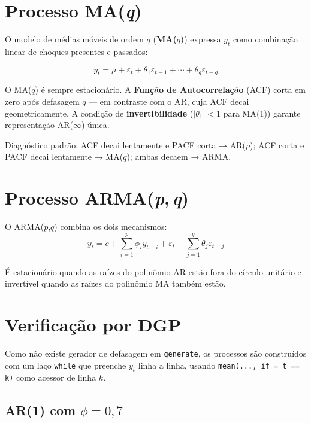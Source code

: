 \section{Processo MA(\textit{q})}

O modelo de médias móveis de ordem $q$ (\textbf{MA($q$)}) expressa $y_t$
como combinação linear de choques presentes e passados:

\[
  y_t = \mu + \varepsilon_t + \theta_1 \varepsilon_{t-1}
        + \cdots + \theta_q \varepsilon_{t-q}
\]

O MA($q$) é sempre estacionário. A \textbf{Função de Autocorrelação} (ACF)
corta em zero após defasagem $q$ — em contraste com o AR, cuja ACF decai
geometricamente. A condição de \textbf{invertibilidade} ($|\theta_1| < 1$
para MA(1)) garante representação AR($\infty$) única.

\begin{nota}
  Diagnóstico padrão: ACF decai lentamente e PACF corta → AR($p$);
  ACF corta e PACF decai lentamente → MA($q$); ambas decaem → ARMA.
\end{nota}

\section{Processo ARMA(\textit{p},\,\textit{q})}

O ARMA($p$,$q$) combina os dois mecanismos:
\[
  y_t = c + \sum_{i=1}^p \phi_i y_{t-i}
        + \varepsilon_t + \sum_{j=1}^q \theta_j \varepsilon_{t-j}
\]

É estacionário quando as raízes do polinômio AR estão fora do círculo
unitário e invertível quando as raízes do polinômio MA também estão.

\section{Verificação por DGP}

Como não existe gerador de defasagem em \lstinline{generate}, os processos
são construídos com um laço \lstinline{while} que preenche $y_t$ linha a
linha, usando \lstinline{mean(..., if = t == k)} como acessor de linha $k$.

\subsection*{AR(1) com $\phi = 0{,}7$}

